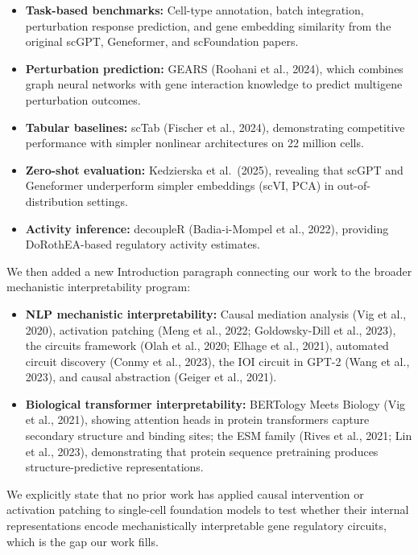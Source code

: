 \documentclass[11pt,letterpaper]{article}
\begin{document}
\begin{itemize}[leftmargin=2em]
\item \textbf{Task-based benchmarks:} Cell-type annotation, batch
  integration, perturbation response prediction, and gene embedding
  similarity from the original scGPT, Geneformer, and scFoundation
  papers.

\item \textbf{Perturbation prediction:} GEARS (Roohani et al., 2024),
  which combines graph neural networks with gene interaction knowledge
  to predict multigene perturbation outcomes.

\item \textbf{Tabular baselines:} scTab (Fischer et al., 2024),
  demonstrating competitive performance with simpler nonlinear
  architectures on 22 million cells.

\item \textbf{Zero-shot evaluation:} Kedzierska et al.\ (2025),
  revealing that scGPT and Geneformer underperform simpler embeddings
  (scVI, PCA) in out-of-distribution settings.

\item \textbf{Activity inference:} decoupleR (Badia-i-Mompel et al.,
  2022), providing DoRothEA-based regulatory activity estimates.
\end{itemize}

We then added a new Introduction paragraph connecting our work to the
broader mechanistic interpretability program:

\begin{itemize}[leftmargin=2em]
\item \textbf{NLP mechanistic interpretability:} Causal mediation
  analysis (Vig et al., 2020), activation patching (Meng et al., 2022;
  Goldowsky-Dill et al., 2023), the circuits framework (Olah et al.,
  2020; Elhage et al., 2021), automated circuit discovery (Conmy et
  al., 2023), the IOI circuit in GPT-2 (Wang et al., 2023), and causal
  abstraction (Geiger et al., 2021).

\item \textbf{Biological transformer interpretability:} BERTology Meets
  Biology (Vig et al., 2021), showing attention heads in protein
  transformers capture secondary structure and binding sites; the ESM
  family (Rives et al., 2021; Lin et al., 2023), demonstrating that
  protein sequence pretraining produces structure-predictive
  representations.
\end{itemize}

We explicitly state that no prior work has applied causal intervention
or activation patching to single-cell foundation models to test whether
their internal representations encode mechanistically interpretable gene
regulatory circuits, which is the gap our work fills.
\end{document}
